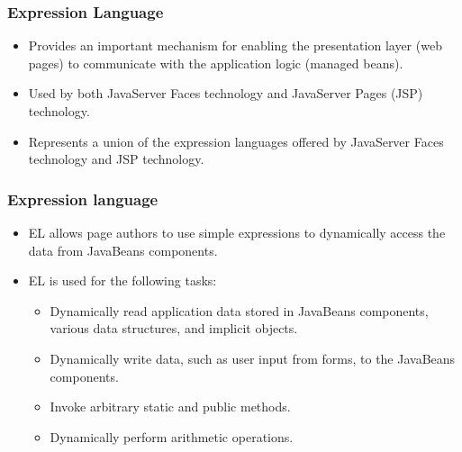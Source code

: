 \documentclass[10pt,xcolor=pdflatex]{beamer}
\begin{document}
\begin{frame}\frametitle{Expression Language}
	\begin{itemize}
    	\item Provides an important mechanism for enabling the presentation layer (web pages) to communicate with the application logic (managed beans).
		\item Used by both JavaServer Faces technology and JavaServer Pages (JSP) technology.
		\item Represents a union of the expression languages offered by JavaServer Faces technology and JSP technology.
    \end{itemize}
\end{frame}


\begin{frame}\frametitle{Expression language}
	\begin{itemize}
    	\item EL allows page authors to use simple expressions to dynamically access the data from JavaBeans components.
		\item EL is used for the following tasks:
          \begin{itemize}
			\item Dynamically read application data stored in JavaBeans components, various data structures, and implicit objects.
			\item Dynamically write data, such as user input from forms, to the JavaBeans components.
			\item Invoke arbitrary static and public methods.
			\item Dynamically perform arithmetic operations.
		  \end{itemize}
    \end{itemize}
\end{frame}
\end{document}
